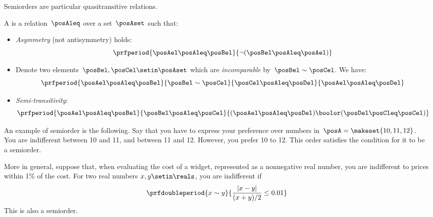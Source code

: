 Semiorders are particular quasitransitive relations.
\begin{definition}[Semiorder]\label{def:semiorder}
    A  is a relation~$\posAleq$ over a set~$\posAset$ such that:
    \begin{itemize}
        \item \emph{Asymmetry} (not antisymmetry) holds:
              \begin{equation}\label{eq:semiorder-asym}
                  \prfperiod{
                      \posAel \posAleq \posBel
                  }{
                      \neg(\posBel \posAleq \posAel)
                  }
              \end{equation}
        \item Denote two elements~$\posBel, \posCel \setin \posAset$ which are \emph{incomparable} by~$\posBel \sim \posCel$.
              We have:
              \begin{equation}\label{eq:el-incomparable}
                  \prfperiod{
                      \posAel \posAleq \posBel
                  }{
                      \posBel \sim \posCel
                  }{
                      \posCel \posAleq \posDel
                  }{
                      \posAel \posAleq \posDel
                  }
              \end{equation}
        \item \emph{Semi-transitivity}:
              \begin{equation}\label{eq:semiorder-2}
                  \prfperiod{
                      \posAel \posAleq \posBel
                  }{
                      \posBel \posAleq \posCel
                  }{
                      (\posAel \posAleq \posDel) \boolor (\posDel \posCleq \posCel)
                  }
              \end{equation}
    \end{itemize}

\end{definition}
\begin{example}
    An example of semiorder is the following.
    Say that you have to express your preference over numbers in~$\posA=\makeset{10,11,12}$.
    You are indifferent between 10 and 11, and between 11 and 12.
    However, you prefer 10 to 12.
    This order satisfies the condition for it to be a semiorder.

    More in general, suppose that, when evaluating the cost of a widget, represented as a nonnegative real number, you are indifferent to prices within 1\% of the cost.
    For two real numbers $x,y\setin\reals$, you are indifferent if
    \begin{equation}\label{eq:semiorder-tolerances}
        \prfdoubleperiod{
            x \sim y
        }{
            \frac{| x - y |}{ (x+y)/2} \leq 0.01
        }
    \end{equation}
    This is also a semiorder.
\end{example}

